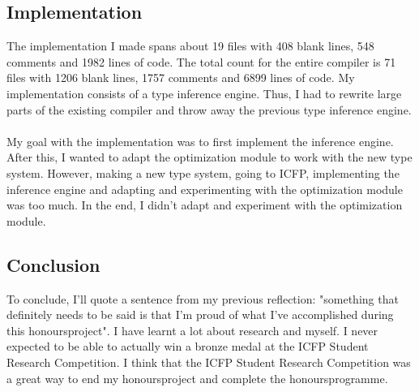 \documentclass[notitlepage]{article}
\begin{document}
\subsection{Implementation}
The implementation I made spans about 19 files with 408 blank lines, 548 comments and 1982 lines of code. The total count for the entire compiler is 71 files with 1206 blank lines, 1757 comments and 6899 lines of code. My implementation consists of a type inference engine. Thus, I had to rewrite large parts of the existing compiler and throw away the previous type inference engine.\\
\\
My goal with the implementation was to first implement the inference engine. After this, I wanted to adapt the optimization module to work with the new type system. However, making a new type system, going to ICFP, implementing the inference engine and adapting and experimenting with the optimization module was too much. In the end, I didn't adapt and experiment with the optimization module.

\subsection{Conclusion}
To conclude, I'll quote a sentence from my previous reflection: "something that definitely needs to be said is that I'm proud of what I've accomplished during this honoursproject". I have learnt a lot about research and myself. I never expected to be able to actually win a bronze medal at the ICFP Student Research Competition. I think that the ICFP Student Research Competition was a great way to end my honoursproject and complete the honoursprogramme.
\end{document}
